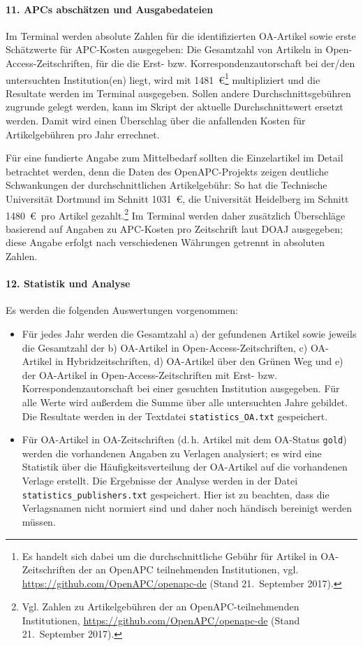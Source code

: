 \paragraph{11. APCs abschätzen und Ausgabedateien}
Im Terminal werden absolute Zahlen für die identifizierten OA-Artikel sowie erste Schätzwerte für APC-Kosten ausgegeben: Die Gesamtzahl von Artikeln in Open-Access-Zeitschriften, für die die Erst- bzw. Korrespondenzautorschaft bei der/den untersuchten Institution(en) liegt, wird mit 1481~\euro\footnote{{Es handelt sich dabei um die durchschnittliche Gebühr für Artikel in OA-Zeitschriften der an OpenAPC teilnehmenden Institutionen, vgl. \url{https://github.com/OpenAPC/openapc-de} (Stand 21.~September 2017).}}
multipliziert und die Resultate werden im Terminal ausgegeben. Sollen andere Durchschnittsgebühren zugrunde gelegt werden, kann im Skript der aktuelle Durchschnittswert ersetzt werden. Damit wird einen Überschlag über die anfallenden Kosten für Artikelgebühren pro Jahr errechnet. 

Für eine fundierte Angabe zum Mittelbedarf sollten die Einzelartikel im Detail betrachtet werden, denn die Daten des OpenAPC-Projekts zeigen deutliche Schwankungen der durchschnittlichen Artikelgebühr: So hat die Technische Universität Dortmund im Schnitt 1031~\euro, die Universität Heidelberg im Schnitt 1480~\euro\ pro Artikel gezahlt.\footnote{Vgl. Zahlen zu Artikelgebühren der an OpenAPC-teilnehmenden Institutionen, \url{https://github.com/OpenAPC/openapc-de} (Stand 21.~September 2017).} Im Terminal werden daher zusätzlich Überschläge basierend auf Angaben zu APC-Kosten pro Zeitschrift laut DOAJ ausgegeben; diese Angabe erfolgt nach verschiedenen Währungen getrennt in absoluten Zahlen.

\paragraph{12. Statistik und Analyse} \label{analyse}
Es werden die folgenden Auswertungen vorgenommen:
\begin{itemize}
     \item Für jedes Jahr werden die Gesamtzahl a) der gefundenen Artikel sowie jeweils die Gesamtzahl der b) OA-Artikel in Open-Access-Zeitschriften, c) OA-Artikel in Hybridzeitschriften, d) OA-Artikel über den Grünen Weg und e) der OA-Artikel in Open-Access-Zeitschriften mit Erst- bzw. Korrespondenzautorschaft bei einer gesuchten Institution ausgegeben. Für alle Werte wird außerdem die Summe über alle untersuchten Jahre gebildet. Die Resultate werden in der Textdatei \texttt{statistics\_OA.txt} gespeichert.
     \item Für OA-Artikel in OA-Zeitschriften (d.\,h. Artikel mit dem OA-Status \texttt{gold}) werden die vorhandenen Angaben zu Verlagen analysiert; es wird eine Statistik über die Häufigkeitsverteilung der OA-Artikel auf die vorhandenen Verlage erstellt. Die Ergebnisse der Analyse werden in der Datei \texttt{statistics\_publishers.txt} gespeichert. Hier ist zu beachten, dass die Verlagsnamen nicht normiert sind und daher noch händisch bereinigt werden müssen. 
\end{itemize}

